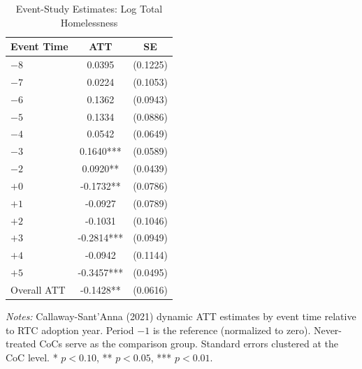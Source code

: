 \begin{table}[htbp]
\centering
\caption{Event-Study Estimates: Log Total Homelessness}
\label{tab:eventstudy}
\begin{tabular}{lcc}
\hline\hline
Event Time & ATT & SE \\
\hline
$-8$ & 0.0395 & (0.1225) \\
$-7$ & 0.0224 & (0.1053) \\
$-6$ & 0.1362 & (0.0943) \\
$-5$ & 0.1334 & (0.0886) \\
$-4$ & 0.0542 & (0.0649) \\
$-3$ & 0.1640*** & (0.0589) \\
$-2$ & 0.0920** & (0.0439) \\
$+0$ & -0.1732** & (0.0786) \\
$+1$ & -0.0927 & (0.0789) \\
$+2$ & -0.1031 & (0.1046) \\
$+3$ & -0.2814*** & (0.0949) \\
$+4$ & -0.0942 & (0.1144) \\
$+5$ & -0.3457*** & (0.0495) \\
\hline
Overall ATT & -0.1428** & (0.0616) \\
\hline\hline
\end{tabular}
\begin{tablenotes}
\item \textit{Notes:} Callaway-Sant'Anna (2021) dynamic ATT estimates by event time relative to RTC adoption year. Period $-1$ is the reference (normalized to zero). Never-treated CoCs serve as the comparison group. Standard errors clustered at the CoC level. * $p < 0.10$, ** $p < 0.05$, *** $p < 0.01$.
\end{tablenotes}
\end{table}
